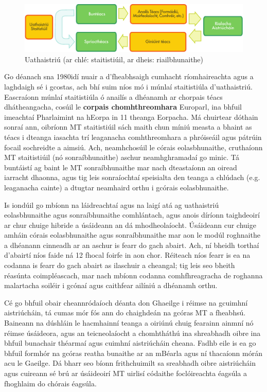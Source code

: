 \begin{multicols}{2}
\begin{figure}[htb]
  \center
  \includegraphics[width=\textwidth]{../_media/irish/machine_translation}
  \caption{Uathaistriú (ar chlé: staitistiúil, ar dheis: riailbhunaithe)}
  \label{fig:mtarch_de}
\end{figure}

Go déanach sna 1980idí nuair a d’fheabhsaigh cumhacht ríomhaireachta agus a laghdaigh sé i gcostas, ach bhí suim níos mó i múnlaí staitistiúla d’uathaistriú. Eascraíonn múnlaí staitistiúla ó anailís a dhéanamh ar chorpais téacs dhátheangacha, cosúil le \textbf{corpais chomhthreomhara} Europarl, ina bhfuil imeachtaí Pharlaimint na hEorpa in 11 theanga Eorpacha. Má chuirtear dóthain sonraí ann, oibríonn MT staitistiúil sách maith chun míniú measta a bhaint as téacs i dteanga iasachta trí leaganacha comhthreomhara a phróiseáil agus pátrúin focail sochreidte a aimsiú. Ach, neamhchosúil le córais eolasbhunaithe, cruthaíonn MT staitistiúil (nó sonraíbhunaithe) aschur neamhghramadaí go minic. Tá buntáistí ag baint le MT sonraíbhunaithe mar nach dteastaíonn an oiread iarracht dhaonna, agus tig leis sonraíochtaí speisialta den teanga a chlúdach (e.g. leaganacha cainte) a dtugtar neamhaird orthu i gcórais eolasbhunaithe. 

Is iondúil go mbíonn na láidreachtaí agus na laigí atá ag uathaistriú eolasbhunaithe agus sonraíbhunaithe comhlántach, agus anois díríonn taighdeoirí ar chur chuige hibride a úsáideann an dá mhodheolaíocht. Úsáideann cur chuige amháin córais eolasbhunaithe agus sonraíbhunaithe mar aon le modúl roghnaithe a dhéanann cinneadh ar an aschur is fearr do gach abairt. Ach, ní bheidh torthaí d'abairtí níos faide ná 12 fhocal foirfe in aon chor. Réiteach níos fearr is ea na codanna is fearr do gach abairt as ilaschuir a cheangal; tig leis seo bheith réasúnta coimpléascach, mar nach mbíonn codanna comhfhreagracha de roghanna malartacha soiléir i gcónaí agus caithfear ailíniú a dhéanamh orthu. 


Cé go bhfuil obair cheannródaíoch déanta don Ghaeilge i réimse na gcuimhní aistriúcháin, tá cumas mór fós ann do chaighdeán na gcóras MT a fheabhsú. Baineann na dúshláin le hacmhainní teanga a oiriúnú chuig fearainn ainmní nó réimse úsáideora, agus an teicneolaíocht a chomhtháthú ina shreabhadh oibre ina bhfuil bunachair théarmaí agus cuimhní aistriúcháin cheana. Fadhb eile is ea go bhfuil formhór na gcóras reatha bunaithe ar an mBéarla agus ní thacaíonn mórán acu le Gaeilge. Dá bharr seo bíonn frithchuimilt sa sreabhadh oibre aistriúcháin agus cuireann sé brú ar úsáideoirí MT uirlisí códaithe foclóireachta éagsúla a fhoghlaim do chórais éagsúla. 



\end{multicols}
